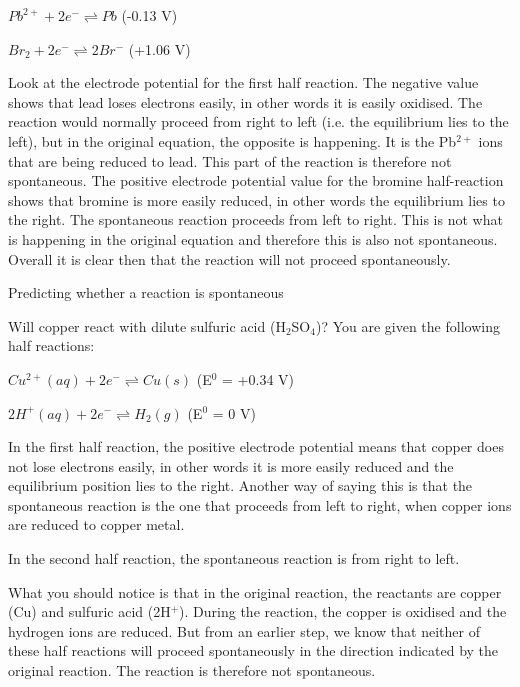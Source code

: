\begin{center}
\rm${Pb^{2+} + 2e^{-} \rightleftharpoons Pb}$ (-0.13 V)

\rm${Br_{2} + 2e^{-} \rightleftharpoons 2Br^{-}}$ (+1.06 V)
\end{center}


Look at the electrode potential for the first half reaction. The negative value shows that lead loses electrons easily, in other words it is easily oxidised. The reaction would normally proceed from right to left (i.e. the equilibrium lies to the left), but in the original equation, the opposite is happening. It is the Pb$^{2+}$ ions that are being reduced to lead. This part of the reaction is therefore not spontaneous. The positive electrode potential value for the bromine half-reaction shows that bromine is more easily reduced, in other words the equilibrium lies to the right. The spontaneous reaction proceeds from left to right. This is not what is happening in the original equation and therefore this is also not spontaneous. Overall it is clear then that the reaction will not proceed spontaneously.

\begin{wex}{Predicting whether a reaction is spontaneous}{Will copper react with dilute sulfuric acid (H$_{2}$SO$_{4}$)? You are given the following half reactions:

\begin{center}
\rm${Cu^{2+}(aq) + 2e^{-} \rightleftharpoons Cu(s)}$ (E$^{0}$ = +0.34 V)

\rm${2H^{+}(aq) + 2e^{-} \rightleftharpoons H_{2}(g)}$ (E$^{0}$ = 0 V)
\end{center} 
}
{
In the first half reaction, the positive electrode potential means that copper does not lose electrons easily, in other words it is more easily reduced and the equilibrium position lies to the right. Another way of saying this is that the spontaneous reaction is the one that proceeds from left to right, when copper ions are reduced to copper metal.

In the second half reaction, the spontaneous reaction is from right to left.


What you should notice is that in the original reaction, the reactants are copper (Cu) and sulfuric acid (2H$^{+}$). During the reaction, the copper is oxidised and the hydrogen ions are reduced. But from an earlier step, we know that neither of these half reactions will proceed spontaneously in the direction indicated by the original reaction. The reaction is therefore not spontaneous.
}
\end{wex} 

